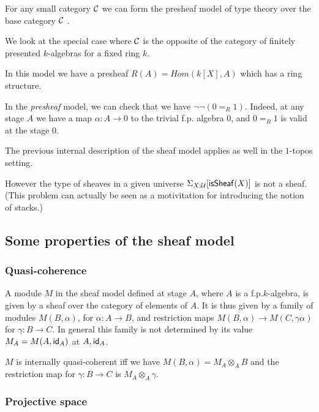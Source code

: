 For any small category $\mathcal{C}$ we can form the presheaf model of type theory over the base category $\mathcal{C}$ \cite{hofmann,huber-phd-thesis}.

\medskip

We look at the special case where $\mathcal{C}$ is the opposite of the category of finitely presented $k$-algebras for a fixed
ring $k$.

    In this model we have a presheaf $R(A) = Hom(k[X],A)$ which has a ring structure.

    In the {\em presheaf} model, we can check that we have $\neg\neg (0=_R 1)$. Indeed, at any stage $A$ we have
    a map $\alpha:A\rightarrow 0$ to the trivial f.p. algebra $0$, and $0 =_R 1$ is valid at the stage $0$.

    The previous internal description of the sheaf model applies as well in the $1$-topos setting.

    \medskip

    However the type of sheaves in a given universe $\Sigma_{X:\mathcal{U}}[\mathsf{isSheaf}(X)]$ is not a sheaf. (This problem can actually be seen as a
    motivitation for introducing the notion of stacks.)

    \subsection{Some properties of the sheaf model}

    \subsubsection{Quasi-coherence}

A module $M$ in the sheaf model defined at stage $A$, where $A$ is a f.p.\@ $k$-algebra, is given by a sheaf over the category
of elements of $A$. It is thus given by a family of modules $M(B,\alpha)$, for $\alpha:A\rightarrow B$, and restriction maps
$M(B,\alpha)\rightarrow M(C,\gamma\alpha)$ for $\gamma:B\rightarrow C$. In general this family is not determined by
its value $M_A = M(A,\mathsf{id}_A)$ at $A,\mathsf{id}_A$.

\begin{proposition}
  $M$ is internally quasi-coherent iff we have $M(B,\alpha) = M_A\otimes_A B$ and the restriction map for
  $\gamma:B\rightarrow C$ is $M_A\otimes_A\gamma$.
\end{proposition}

    \subsubsection{Projective space}


